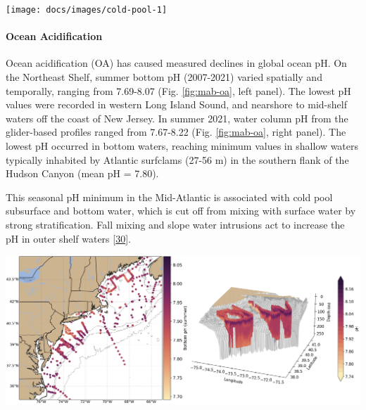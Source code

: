 \documentclass[
  10pt,
]{article}
\let\origfigure\figure
\let\endorigfigure\endfigure
\renewenvironment{figure}[1][2] {
    \expandafter\origfigure\expandafter[H]
} {
    \endorigfigure
}
\begin{document}
\begin{figure}

{\centering \texttt{[image: docs/images/cold-pool-1]} 

}

\caption{Seasonal cold pool indices: mean temperature within the cold pool, cold pool persistence, and spatial extent.}\label{fig:cold-pool}
\end{figure}

\hypertarget{ocean-acidification}{%
\paragraph{Ocean Acidification}\label{ocean-acidification}}

Ocean acidification (OA) has caused measured declines in global ocean
pH. On the Northeast Shelf, summer bottom pH (2007-2021) varied
spatially and temporally, ranging from 7.69-8.07 (Fig. \ref{fig:mab-oa},
left panel). The lowest pH values were recorded in western Long Island
Sound, and nearshore to mid-shelf waters off the coast of New Jersey. In
summer 2021, water column pH from the glider-based profiles ranged from
7.67-8.22 (Fig. \ref{fig:mab-oa}, right panel). The lowest pH occurred
in bottom waters, reaching minimum values in shallow waters typically
inhabited by Atlantic surfclams (27-56 m) in the southern flank of the
Hudson Canyon (mean pH = 7.80).

This seasonal pH minimum in the Mid-Atlantic is associated with cold
pool subsurface and bottom water, which is cut off from mixing with
surface water by strong stratification. Fall mixing and slope water
intrusions act to increase the pH in outer shelf waters
{[}\protect\hyperlink{ref-wrightfairbanks_autonomous_2020}{30}{]}.

\begin{figure}

{\centering \includegraphics[width=0.8\linewidth]{images/Saba_Fig_SOE_MAFMC - Grace Saba} 

}

\caption{Left: Summer bottom pH collated from all quality-controlled vessel- and glider-based measurements from 2007-2021. Right: Glider-based pH profiles collected during summer 2021 in the Mid-Atlantic.}\label{fig:mab-oa}
\end{figure}
\end{document}
